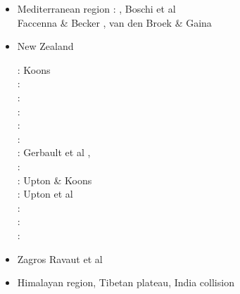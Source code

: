 \begin{itemize}
\item Mediterranean region 
{\scriptsize
\cite{pimo97}\cite{nesg97}
\cite{nesb99}
\cite{wosp00}
\cite{pimo03}
\twothousandfour: \cite{spwo04}, Boschi et al \cite{boek04}\\
\cite{wogs09}
\cite{bofb10}\cite{fabe10}
\cite{chsv14}\cite{chsg14}\cite{vavs14}\cite{mafv14}
\cite{mesj16}
\cite{spcv18}
\cite{blgf20}
Faccenna \& Becker \cite{fabe20}, van den Broek \& Gaina \cite{vaga20}
}
\item {New Zealand} 
\begin{scriptsize}
\nineteenninety: Koons \cite{koon90}\\
\nineteenninetyfive: \cite{brbe95}\\
\nineteenninetysix: \cite{bekh96}\\
\nineteenninetyeight: \cite{wabb98}\\
\nineteenninetynine: \cite{babr99}\\
\twothousandtwo: \cite{gedh02}\cite{pybf02}\\
\twothousandthree: Gerbault et al \cite{gehd03}, \cite{konc03}\cite{upke03}\\
\twothousandsix: \cite{libi06}\\
\twothousandseven: Upton \& Koons \cite{upko07}\\
\twothousandnine: Upton et al \cite{upkc09}\\
\twothousandten: \cite{pyeg10}\cite{spgs10a}\\
\twothousandtwelve: \cite{grel12}\\
\twothousandthirteen: \cite{sths13}
\end{scriptsize}

\item {Zagros} 
{\scriptsize
Ravaut et al \cite{rabh97}
\cite{vech06}
\cite{hamo10}
\cite{yakm11}
\cite{nipc13}
\cite{frba14}
\cite{ghbu14}
\cite{coyc16}
\cite{rugb17}
}
\item {Himalayan region, Tibetan plateau, India collision} 


\end{itemize}
